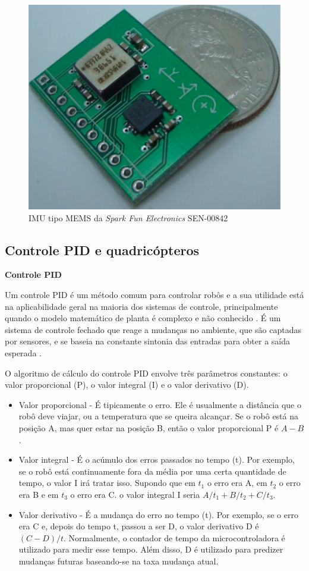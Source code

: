 \documentclass[a4paper, 12pt]{article}
\begin{document}
\begin{figure}[h]
	\centering
		\includegraphics[scale=0.3]{img/imumems.png}
	\caption{IMU tipo MEMS da \textit{Spark Fun Electronics} SEN-00842}
	\label{fig:imumems}
\end{figure}

\subsection{Controle PID e quadricópteros}

\noindent\textbf{Controle PID}

Um controle PID é um método comum para controlar robôs e a sua utilidade está na aplicabilidade geral na maioria dos sistemas de controle, principalmente quando o modelo matemático de planta é complexo e não conhecido \cite{Ogata2003}. É um sistema de controle fechado que reage a mudanças no ambiente, que são captadas por sensores, e se baseia na constante sintonia das entradas para obter a saída esperada \cite{Kingdom}.  

O algoritmo de cálculo do controle PID envolve três parâmetros constantes: o valor proporcional (P), o valor integral (I) e o valor derivativo (D).

\begin{itemize}
\item
Valor proporcional - É tipicamente o erro. Ele é usualmente a distância que o robô deve viajar, ou a temperatura que se queira alcançar. Se o robô está na posição A, mas quer estar na posição B, então o valor proporcional P é $A - B$.
\item
Valor integral - É o acúmulo dos erros passados no tempo (t). Por exemplo, se o robô está continuamente fora da média por uma certa quantidade de tempo, o valor I irá tratar isso. Supondo que em $t_1$ o erro era A, em $t_2$ o erro era B e em $t_3$ o erro era C. o valor integral I seria $A/t_1 + B/t_2 + C/t_3$.
\item
Valor derivativo - É a mudança do erro no tempo (t). Por exemplo, se o erro era C e, depois do tempo t, passou a ser D, o valor derivativo D é $(C-D)/t$. Normalmente, o contador de tempo da microcontroladora é utilizado para medir esse tempo. Além disso, D é utilizado para predizer mudanças futuras baseando-se na taxa mudança atual.
\end{itemize}
\end{document}
